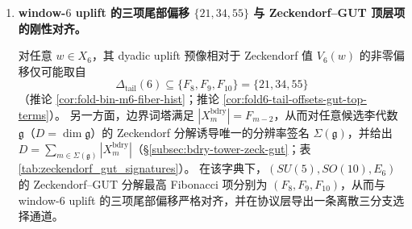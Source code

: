 \begin{enumerate}
  \begin{theorem}\label{thm:terminal-window6-edge-flux-skeleton}
  令 \(Q_6\) 为 \(6\) 维超立方体图，\(F_6:=\mathrm{Fold}^{\mathrm{bin}}_6:\Omega_6\to X_6\) 为 window-\(6\) 的 dyadic 折叠标签函数。
  采用表 \ref{tab:window6_patisalam_9633_partition} 的刚性四块分解
  \(
  X_6=X^{(2)}_6\sqcup X^{(1)}_6\sqcup X^{(L)}_6\sqcup X^{(R)}_6
  \)，并令相应的微观顶点并集
  \[
  U_\alpha:=\bigcup_{w\in X^{(\alpha)}_6}F_6^{-1}(w)\subset \Omega_6
  \qquad (\alpha\in\{2,1,L,R\}).
  \]
  定义四块之间的无向边计数（对称矩阵）
  \[
  E_{\alpha\beta}
  :=\#\bigl\{\{\omega,\omega'\}\in E(Q_6):\ \omega\in U_\alpha,\ \omega'\in U_\beta\bigr\},
  \qquad (\alpha,\beta\in\{2,1,L,R\}),
  \]
  并以各块内的均匀先验（在 \(U_\alpha\) 上均匀分布）定义粗粒化 Markov 核
  \[
  T_{\alpha\beta}=
  \begin{cases}
    \dfrac{2E_{\alpha\alpha}}{6|U_\alpha|}, & \alpha=\beta,\\[6pt]
    \dfrac{E_{\alpha\beta}}{6|U_\alpha|}, & \alpha\neq\beta.
  \end{cases}
  \]
  则四块微观体积 \(|U_\alpha|\)、边计数矩阵 \(E\)、核 \(T\) 以及其特征多项式分解与 boundary 扇区割/通量常数
  \(\Phi_R=\frac{|\partial U_R|}{64\cdot 6}=\frac{1}{12}\)
  由可复核的有限穷举唯一确定，并由生成片段 \eqref{eq:window6_edge_flux_skeleton} 给出（含 \(\mathbb{P}(\text{leave }U_R\mid U_R)=\frac{8}{9}\)）。
  特别地，\(T\) 可逆且以 \(\pi_\alpha=|U_\alpha|/64\) 为平稳分布（由 \(Q_6\) 简单随机游走的均匀平衡与有限计数详细平衡恒等式导出）。
  \end{theorem}
  
  

  \item \textbf{window-\(6\) uplift 的三项尾部偏移 \(\{21,34,55\}\) 与 Zeckendorf--GUT 顶层项的刚性对齐。}

  \begin{theorem}
  \label{thm:terminal-window6-tail-three-branch}
  对任意 \(w\in X_6\)，其 dyadic uplift 预像相对于 Zeckendorf 值 \(V_6(w)\) 的非零偏移仅可能取自
  \[
  \Delta_{\mathrm{tail}}(6)\subseteq\{F_8,F_9,F_{10}\}=\{21,34,55\}
  \]
  （推论 \ref{cor:fold-bin-m6-fiber-hist}；推论 \ref{cor:fold6-tail-offsets-gut-top-terms}）。
  另一方面，边界词塔满足 \(|X_m^{\mathrm{bdry}}|=F_{m-2}\)，从而对任意候选李代数 \(\mathfrak g\)（\(D=\dim\mathfrak g\)）的 Zeckendorf 分解诱导唯一的分辨率签名 \(\Sigma(\mathfrak g)\)，并给出
  \(D=\sum_{m\in\Sigma(\mathfrak g)}|X_m^{\mathrm{bdry}}|\)（\S\ref{subsec:bdry-tower-zeck-gut}；表 \ref{tab:zeckendorf_gut_signatures}）。
  在该字典下，\((SU(5),SO(10),E_6)\) 的 Zeckendorf--GUT 分解最高 Fibonacci 项分别为 \((F_8,F_9,F_{10})\)，从而与 window-\(6\) uplift 的三项尾部偏移严格对齐，并在协议层导出一条离散三分支选择通道。
  \end{theorem}


\end{enumerate}
